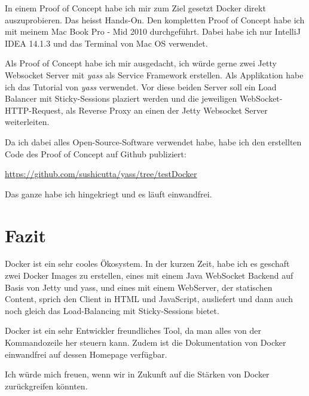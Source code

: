 In einem Proof of Concept habe ich mir zum Ziel gesetzt Docker direkt auszuprobieren. Das heisst
Hands-On. Den kompletten Proof of Concept habe ich mit meinem Mac Book Pro - Mid 2010 durchgeführt.
Dabei habe ich nur IntelliJ IDEA 14.1.3 und das Terminal von Mac OS verwendet.

Als Proof of Concept habe ich mir ausgedacht, ich würde gerne zwei Jetty Websocket Server
mit \textit{yass} als Service Framework erstellen. Als Applikation habe ich das Tutorial
von \textit{yass} verwendet. Vor diese beiden Server soll ein Load Balancer mit
Sticky-Sessions plaziert werden und die jeweiligen WebSocket-HTTP-Request, als Reverse Proxy
an einen der Jetty Websocket Server weiterleiten.

Da ich dabei alles Open-Source-Software verwendet habe, habe ich den erstellten Code des Proof
of Concept auf Github publiziert:

\url{https://github.com/sushicutta/yass/tree/testDocker}

Das ganze habe ich hingekriegt und es läuft einwandfrei.

\section{Fazit}

Docker ist ein sehr cooles Ökosystem. In der kurzen Zeit, habe ich es geschaft zwei Docker Images
zu erstellen, eines mit einem Java WebSocket Backend auf Basis von Jetty und yass, und eines
mit einem WebServer, der statischen Content, sprich den Client in HTML und JavaScript, ausliefert
und dann auch noch gleich das Load-Balancing mit Sticky-Sessions bietet.

Docker ist ein sehr Entwickler freundliches Tool, da man alles von der Kommandozeile her steuern
kann. Zudem ist die Dokumentation von Docker einwandfrei auf dessen Homepage verfügbar.

Ich würde mich freuen, wenn wir in Zukunft auf die Stärken von Docker zurückgreifen könnten.